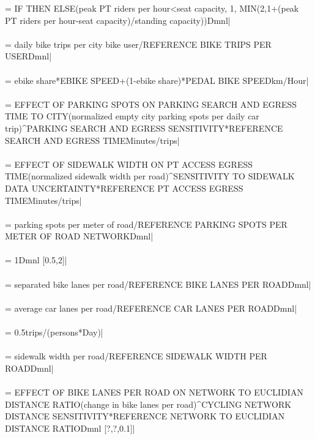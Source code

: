  = {\small IF THEN ELSE(peak PT riders per hour<seat capacity, 1, MIN(2,1+(peak PT riders per hour-seat capacity)/standing capacity))Dmnl|} \\ \\ 
 = {\small daily bike trips per city bike user/REFERENCE BIKE TRIPS PER USERDmnl|} \\ \\ 
 = {\small ebike share*EBIKE SPEED+(1-ebike share)*PEDAL BIKE SPEEDkm/Hour|} \\ \\ 
 = {\small EFFECT OF PARKING SPOTS ON PARKING SEARCH AND EGRESS TIME TO CITY(normalized empty city parking spots per daily car trip)\^{}PARKING SEARCH AND EGRESS SENSITIVITY*REFERENCE SEARCH AND EGRESS TIMEMinutes/trips|} \\ \\ 
 = {\small EFFECT OF SIDEWALK WIDTH ON PT ACCESS EGRESS TIME(normalized sidewalk width per road)\^{}SENSITIVITY TO SIDEWALK DATA UNCERTAINTY*REFERENCE PT ACCESS EGRESS TIMEMinutes/trips|} \\ \\ 
 = {\small parking spots per meter of road/REFERENCE PARKING SPOTS PER METER OF ROAD NETWORKDmnl|} \\ \\ 
 = {\small 1Dmnl [0.5,2]|} \\ \\ 
 = {\small separated bike lanes per road/REFERENCE BIKE LANES PER ROADDmnl|} \\ \\ 
 = {\small average car lanes per road/REFERENCE CAR LANES PER ROADDmnl|} \\ \\ 
 = {\small 0.5trips/(persons*Day)|} \\ \\ 
 = {\small sidewalk width per road/REFERENCE SIDEWALK WIDTH PER ROADDmnl|} \\ \\ 
 = {\small EFFECT OF BIKE LANES PER ROAD ON NETWORK TO EUCLIDIAN DISTANCE RATIO(change in bike lanes per road)\^{}CYCLING NETWORK DISTANCE SENSITIVITY*REFERENCE NETWORK TO EUCLIDIAN DISTANCE RATIODmnl [?,?,0.1]|} \\ \\ 
